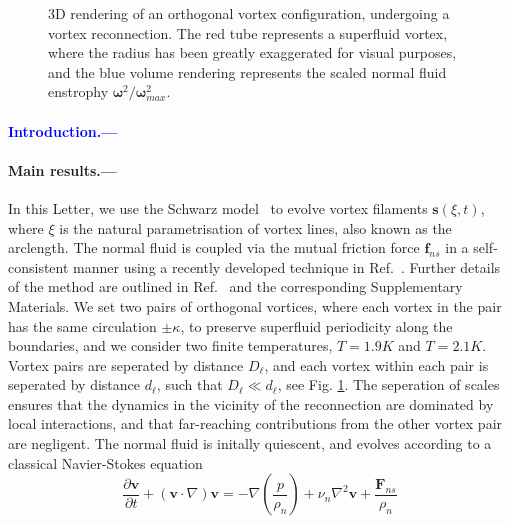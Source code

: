 \documentclass[%
 reprint,
 amsmath,amssymb,
 aps,
 prl,
]{revtex4-2}
\newcommand{\bom}{\boldsymbol{\omega}}
\def \s{\mathbf{s}}
\def \v{\mathbf{v}}
\def\blue#1{\textcolor{blue}{#1}}
\begin{document}
\begin{figure}
\begin{subfigure}[b]{0.24\textwidth}
	\end{subfigure}
    \hfill
	\caption{3D rendering of an orthogonal vortex configuration, undergoing a vortex reconnection. The red tube represents a superfluid vortex, where the radius has been greatly exaggerated for visual purposes, and the blue volume rendering represents the scaled normal fluid enstrophy $\bom^2/\bom^2_{max}$.}
    \label{fig:visualisation}
\end{figure}


\blue{
\paragraph*{Introduction.---}\blindtext[5]
}


\paragraph*{Main results.---} In this Letter, we use the Schwarz model~\cite{schwarzThreedimensionalVortexDynamics1988a} to evolve vortex filaments $\s(\xi,t)$, where $\xi$ is the natural parametrisation of vortex lines, also known as the arclength. The normal fluid is coupled via the mutual friction force $\mathbf{f}_{ns}$ in a self-consistent manner using a recently developed technique in Ref.~\cite{galantucciNewSelfconsistentApproach2020b}. Further details of the method are outlined in Ref.~\cite{PunctuatedEnergyInjectionb} and the corresponding Supplementary Materials. We set two pairs of orthogonal vortices, where each vortex in the pair has the same circulation $\pm\kappa$, to preserve superfluid periodicity along the boundaries, and we consider two finite temperatures, $T=1.9K$ and $T=2.1K$. Vortex pairs are seperated by distance $D_{\ell}$, and each vortex within each pair is seperated by distance $d_{\ell}$, such that $D_{\ell}\ll d_{\ell}$, see Fig. \ref{fig:visualisation}. The seperation of scales ensures that the dynamics in the vicinity of the reconnection are dominated by local interactions, and that far-reaching contributions from the other vortex pair are negligent. The normal fluid is initally quiescent, and evolves according to a classical Navier-Stokes equation
\begin{equation}
    \frac{\partial\v}{\partial t } + (\v\cdot\nabla)\v = -\nabla\left(\frac{p}{\rho_n}\right) + \nu_n\nabla^2\v + \frac{\mathbf{F}_{ns}}{\rho_n}
\end{equation} 
\end{document}
